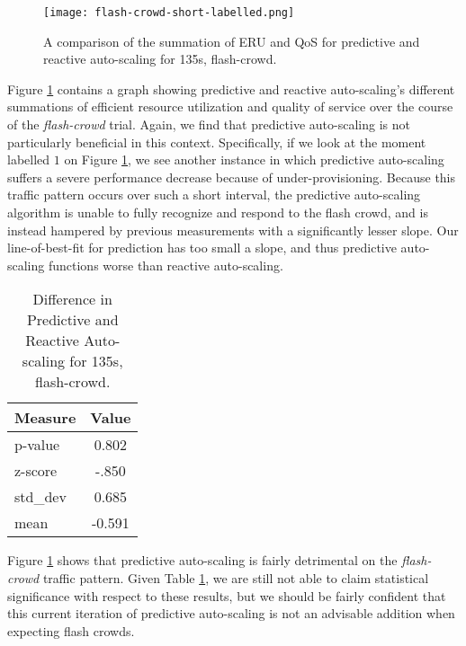 \begin{figure}[!h]
  \centerline{\texttt{[image: flash-crowd-short-labelled.png]}}
  \caption{A comparison of the summation of ERU and QoS for
    predictive and reactive auto-scaling for 135s, flash-crowd.}
  \label{fig:135s-flash-crowd-labelled}
\end{figure}

Figure \ref{fig:135s-flash-crowd-labelled} contains a graph
showing predictive and reactive auto-scaling's different
summations of efficient resource utilization and quality of service over the
course of the \textit{flash-crowd} trial. Again,
we find that predictive auto-scaling is not particularly
beneficial in this context. Specifically, if we look at the moment labelled
$1$ on Figure \ref{fig:135s-flash-crowd-labelled}, we see another instance in which
predictive auto-scaling suffers a severe performance decrease because of
under-provisioning. Because this traffic pattern occurs over such a short
interval, the predictive auto-scaling algorithm is unable to fully recognize and
respond to the flash crowd, and is instead hampered by previous measurements
with a significantly lesser slope. Our line-of-best-fit for prediction has too
small a slope, and thus predictive auto-scaling functions worse than reactive
auto-scaling.

\begin{table}[htbp]
  \centering
  \caption{Difference in Predictive and Reactive Auto-scaling for 135s,
  flash-crowd.}
  \label{tab:135s-flash-crowd}
\begin{tabular}{l c}\hline\hline
    \multicolumn{1}{c}{\textbf{Measure}} & \textbf{Value} \\ \hline
     p-value & 0.802 \\
     z-score & -.850 \\
     std\_dev & 0.685 \\
     mean & -0.591
  \end{tabular}
\end{table}

Figure \ref{fig:135s-flash-crowd-labelled} shows that predictive
auto-scaling is fairly detrimental on the \textit{flash-crowd} traffic pattern.
Given Table \ref{tab:135s-flash-crowd}, we are still not able to claim
statistical significance with respect to these results, but we should be fairly
confident that this current iteration of predictive auto-scaling is not an advisable addition
when expecting flash crowds.
